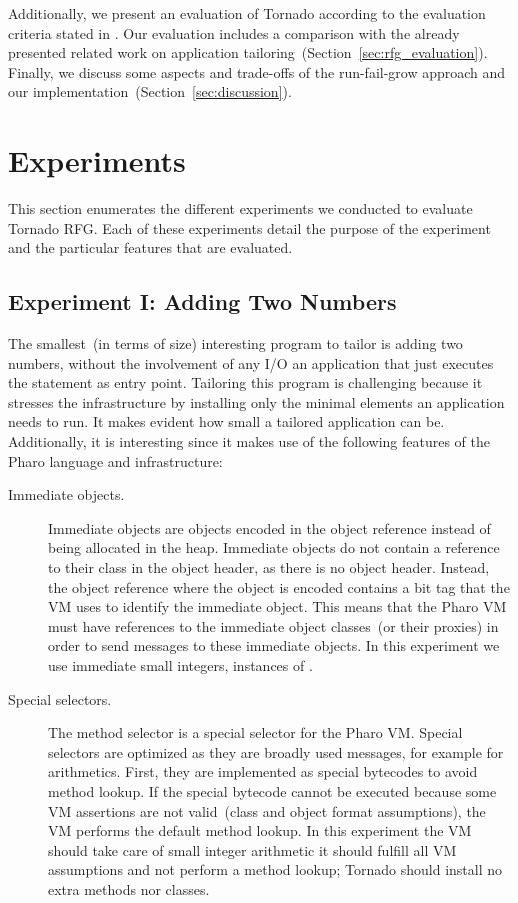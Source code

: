 Additionally, we present an evaluation of Tornado according to the evaluation criteria stated in . Our evaluation includes a comparison with the already presented related work on application tailoring~(Section~\ref{sec:rfg_evaluation}).
Finally, we discuss some aspects and trade-offs of the run-fail-grow approach and our implementation~(Section~\ref{sec:discussion}).

\section{Experiments}\label{sec:rfg_experiments}

This section enumerates the different experiments we conducted to evaluate Tornado RFG. Each of these experiments detail the purpose of the experiment and the particular features that are evaluated.

\subsection*{Experiment I: Adding Two Numbers}

The smallest~(in terms of size) interesting program to tailor is adding two numbers, without the involvement of any I/O \ie an application that just executes the  statement as entry point. Tailoring this program is challenging because it stresses the infrastructure by installing only the minimal elements an application needs to run. It makes evident how small a tailored application can be. Additionally, it is interesting since it makes use of the following features of the Pharo language and infrastructure:

\begin{description}
\item[Immediate objects.] Immediate objects are objects encoded in the object reference instead of being allocated in the heap. Immediate objects do not contain a reference to their class in the object header, as there is no object header. Instead, the object reference where the object is encoded contains a bit tag that the VM uses to identify the immediate object. This means that the Pharo VM must have references to the immediate object classes~(or their proxies) in order to send messages to these immediate objects. In this experiment we use immediate small integers, instances of .
\item[Special selectors.] The method selector \ct{+} is a special selector for the Pharo VM. Special selectors are optimized as they are broadly used messages, for example for arithmetics. First, they are implemented as special bytecodes to avoid method lookup. If the special bytecode cannot be executed because some VM assertions are not valid~(\eg class and object format assumptions), the VM performs the default method lookup. In this experiment the VM should take care of small integer arithmetic \ie it should fulfill all VM assumptions and not perform a method lookup; Tornado should install no extra methods nor classes.
\end{description}

